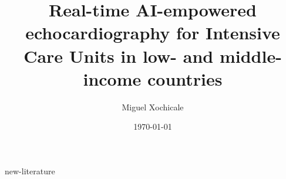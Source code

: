 \documentclass[12pt]{article}
\title{
Real-time AI-empowered echocardiography for Intensive Care Units in low- and middle-income countries %
}
\author{
Miguel Xochicale
}
\date{
\today
}
\begin{document}
\maketitle
\thispagestyle{empty} %

\tableofcontents
{new-literature}


\end{document}
